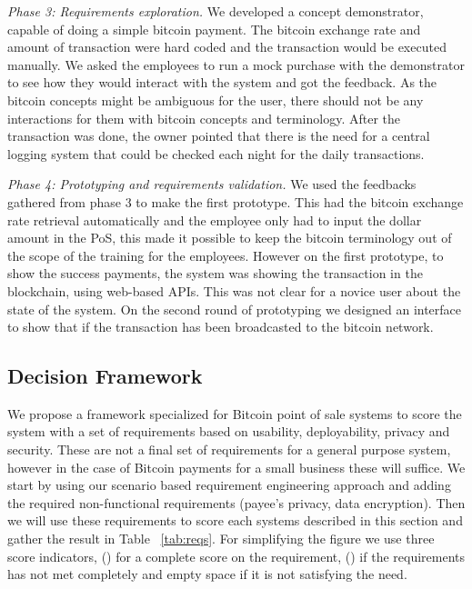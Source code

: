 \textit{Phase 3: Requirements exploration.}
We developed a concept demonstrator, capable of doing a simple bitcoin payment. The bitcoin exchange rate and amount of transaction were hard coded and the transaction would be executed manually. We asked the employees to run a mock purchase with the demonstrator to see how they would interact with the system and got the feedback. As the bitcoin concepts might be ambiguous for the user, there should not be any interactions for them with bitcoin concepts and terminology. After the transaction was done, the owner pointed that there is the need for a central logging system that could be checked each night for the daily transactions.

\textit{Phase 4: Prototyping and requirements validation.}
We used the feedbacks gathered from phase 3 to make the first prototype. This had the bitcoin exchange rate retrieval automatically and the employee only had to input the dollar amount in the PoS, this made it possible to keep the bitcoin terminology out of the scope of the training for the employees. However on the first prototype, to show the success payments, the system was showing the transaction in the blockchain, using web-based APIs. This was not clear for a novice user about the state of the system. On the second round of prototyping we designed an interface to show that if the transaction has been broadcasted to the bitcoin network.\\



\subsection{Decision Framework}
We propose a framework specialized for Bitcoin point of sale systems to score the system with a set of requirements based on usability, deployability, privacy and security. These are not a final set of requirements for a general purpose system, however in the case of Bitcoin payments for a small business these will suffice.
We start by using our scenario based requirement engineering approach and adding the required non-functional requirements (\eg payee's privacy, data encryption). Then we will use these requirements to score each systems described in this section and gather the result in Table ~\ref{tab:reqs}. For simplifying the figure we use three score indicators,  (\full) for a complete score on the requirement, (\prt) if the requirements has not met completely and empty space if it is not satisfying the need.\ 


